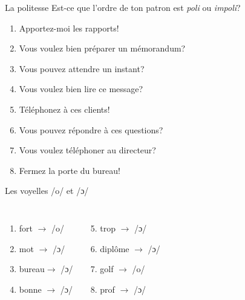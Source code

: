\documentclass{beamer}
\begin{document}
  \begin{frame}{La politesse}
    Est-ce que l'ordre de ton patron  est \emph{ poli } ou \emph{impoli}?
    \begin{center}
      \begin{enumerate}
        \item Apportez-moi les rapports! \underline{}
        \item Vous voulez bien préparer un mémorandum? \underline{}
        \item Vous pouvez attendre un instant? \underline{}
        \item Vous voulez bien lire ce message? \underline{}
        \item Téléphonez à ces clients! \underline{}
        \item Vous pouvez répondre à ces questions? \underline{}
        \item Vous voulez téléphoner au directeur? \underline{}
        \item Fermez la porte du bureau! \underline{}
      \end{enumerate}
    \end{center}
  \end{frame}

  \begin{frame}{Les voyelles /o/ et /ɔ/}
    \begin{columns}
        \begin{enumerate}
          \item fort $\to$ /o/ 
          \item mot $\to$  /ɔ/
          \item bureau$\to$  /ɔ/
          \item bonne $\to$  /ɔ/
        \end{enumerate}
        \begin{enumerate}
          \setcounter{enumi}{4}
          \item trop $\to$  /ɔ/
          \item diplôme $\to$  /ɔ/
          \item golf $\to$ /o/ 
          \item prof $\to$  /ɔ/
        \end{enumerate}
    \end{columns}
  \end{frame}
\end{document}
